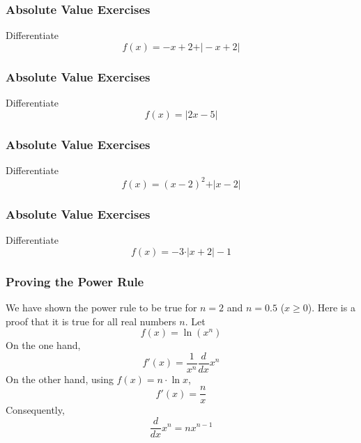 \documentclass[xcolor=dvipsnames]{beamer}
\begin{document}
\begin{frame}
  \frametitle{Absolute Value Exercises}
{\ubung} Differentiate
\begin{equation}
  \label{eq:ikaishup}
  f(x)=-x+2+\vert{}-x+2\vert
\end{equation}
\end{frame}

\begin{frame}
  \frametitle{Absolute Value Exercises}
{\ubung} Differentiate
\begin{equation}
  \label{eq:emaiyito}
  f(x)=\vert{}2x-5\vert
\end{equation}
\end{frame}

\begin{frame}
  \frametitle{Absolute Value Exercises}
{\ubung} Differentiate
\begin{equation}
  \label{eq:deiquohr}
  f(x)=(x-2)^{2}+\vert{}x-2\vert
\end{equation}
\end{frame}

\begin{frame}
  \frametitle{Absolute Value Exercises}
{\ubung} Differentiate
\begin{equation}
  \label{eq:leihuwee}
  f(x)=-3\cdot\vert{}x+2\vert{}-1
\end{equation}
\end{frame}

\begin{frame}
  \frametitle{Proving the Power Rule}
  We have shown the power rule to be true for $n=2$ and $n=0.5$
  ($x\geq{}0$). Here is a proof that it is true for all real numbers
  $n$. Let
\begin{equation}
  \label{eq:taesaeph}
  f(x)=\ln\left({}x^{n}\right)
\end{equation}
On the one hand,
\begin{equation}
  \label{eq:uzahheir}
  f'(x)=\frac{1}{x^{n}}\frac{d}{dx}x^{n}
\end{equation}
On the other hand, using $f(x)=n\cdot\ln{}x$,
\begin{equation}
  \label{eq:veikoowa}
f'(x)=\frac{n}{x}  
\end{equation}
Consequently,
\begin{equation}
  \label{eq:aebiedah}
  \frac{d}{dx}x^{n}=nx^{n-1}
\end{equation}
\end{frame}
\end{document}
